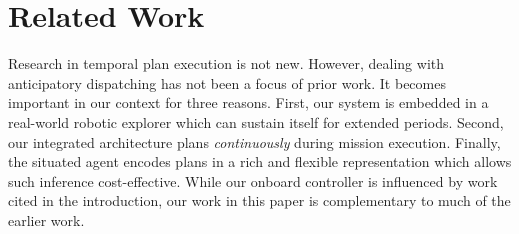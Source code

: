 \section{Related Work}
\label{sec:related}


Research in temporal plan execution is not new. However, dealing with
anticipatory dispatching has not been a focus of prior work. It
becomes important in our context for three reasons. First, our
system is embedded in a real-world robotic explorer which can sustain
itself for extended periods. Second, our integrated
architecture \rx \cite{mcgann08bdup,py10dup,rajan12dup} plans
\emph{continuously} during mission execution. Finally, the situated
agent encodes plans in a rich and flexible representation which allows
such inference cost-effective.  While our onboard controller is
influenced by work cited in the introduction, our work in this paper
is complementary to much of the earlier work.



